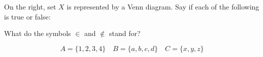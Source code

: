 \documentclass[12pt, a4paper, addpoints]{exam}
\newcommand{\ts}{\vspace{9mm}}
\begin{document}
\begin{questions}
\question 
On the right, set $X$ is represented by a Venn diagram. Say if each of the following is true or false:

\begin{minipage}{0.5\textwidth}
\end{minipage}
\begin{minipage}{0.5\textwidth}
    \begin{center}
    \end{center}
\end{minipage}






\newpage

\question What do the symbols $\in$ and $\notin$ stand for?

\[
A = \{1, 2, 3, 4\} \quad B = \{a, b, c, d\} \quad C = \{x, y, z\}
\]


\end{questions}
\end{document}
